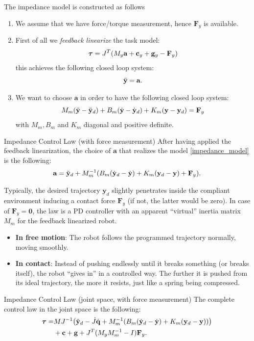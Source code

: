 \documentclass[10pt, a4paper]{report}
\newcommand{\y}{{\mathbf y}}
\begin{document}
The impedance model is constructed as follows\begin{enumerate}
    \item We assume that we have force/torque measurement, hence $\mathbf F_y$ is available. 
    \item First of all we \textit{feedback linearize} the task model:\begin{equation}
        {\boldsymbol{\tau}}=J^{T}(M_y\mathbf a+\mathbf c_y+\mathbf g_y-\mathbf F_y)
    \end{equation}
    this achieves the following closed loop system:\begin{equation}
        {\ddot{\mathbf y}}=\mathbf a.
    \end{equation}
    \item We want to choose $\mathbf a$ in order to have the following closed loop system:\begin{equation}\label{impedance_model}
        M_m(\ddy-\ddy_d)+B_m(\dy-\dy_d)+K_m(\y-\y_d)=\mathbf F_y 
    \end{equation}
    with $M_m,B_m$ and $K_m$ diagonal and positive definite.
\end{enumerate}
\begin{boxdefinition}{Impedance Control Law (with force measurement)}{}
    After having applied the feedback linearization, the choice of $\mathbf a$ that realizes the model \eqref{impedance_model} is the following:\begin{equation}
        \mathbf a = \ddy_d+M_m^{-1}(B_m(\dy_d-\dy)+K_m(\y_d-\y)+\mathbf F_y) 
        .
    \end{equation}
\end{boxdefinition}
Typically, the desired trajectory $\y_d$ slightly penetrates inside the compliant environment inducing a contact force $\mathbf F_y$ (if not, the latter would be zero). In case of $\mathbf F_y=\mathbf 0$, the law is a PD controller with an apparent ``virtual'' inertia matrix $M_m$ for the feedback linearized robot.\begin{itemize}
    \item \textbf{In free motion}: The robot follows the programmed trajectory normally, moving smoothly.
    \item \textbf{In contact}: Instead of pushing endlessly until it breaks something (or breaks itself), the robot ``gives in'' in a controlled way. The further it is pushed from its ideal trajectory, the more it resists, just like a spring being compressed.
\end{itemize}
\begin{boxdefinition}{Impedance Control Law (joint space, with force measurement)}{}
    The complete control law in the joint space is the following:\begin{align}
        \btau=&MJ^{-1}\big(
        \ddy_d-\dot J\dq+M_m^{-1}(B_m(\dy_d-\dy)+K_m(\y_d-\y))    
        \big)
        \\ &+ \mathbf c+\mathbf g+J^T(M_yM_m^{-1}-I)\mathbf F_y.
    \end{align}
\end{boxdefinition}
\end{document}
